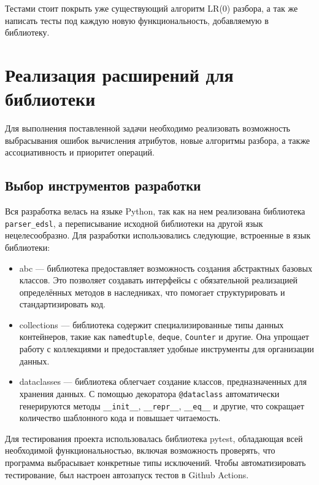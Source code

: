 \documentclass[14pt, russian]{scrartcl}
\begin{document}
Тестами стоит покрыть уже существующий алгоритм LR(0) разбора, а так же написать тесты под каждую новую функциональность,
добавляемую в библиотеку.

\section{Реализация расширений для библиотеки}

Для выполнения поставленной задачи необходимо реализовать возможность выбрасывания ошибок вычисления атрибутов,
новые алгоритмы разбора, а также ассоциативность и приоритет операций.

\subsection{Выбор инструментов разработки}

Вся разработка велась на языке Python, так как на нем реализована библиотека \texttt{parser\_edsl}, а переписывание
исходной библиотеки на другой язык нецелесообразно. Для разработки использовались следующие, встроенные в
язык библиотеки:

\begin{itemize}
	\item abc\cite{abc} --- библиотека предоставляет возможность создания абстрактных базовых классов. Это позволяет
	создавать интерфейсы с обязательной реализацией определённых методов в
	наследниках, что помогает структурировать и стандартизировать код.
	\item collections\cite{collections} --- библиотека содержит специализированные типы данных контейнеров, такие как
	\texttt{namedtuple}, \texttt{deque}, \texttt{Counter} и другие. Она упрощает работу с коллекциями и
	предоставляет удобные инструменты для организации данных.
	\item dataclasses\cite{dataclasses} --- библиотека облегчает создание классов, предназначенных для хранения данных. С помощью
	декоратора \texttt{@dataclass} автоматически генерируются методы \texttt{\_\_init\_\_}, \texttt{\_\_repr\_\_},
	\texttt{\_\_eq\_\_} и другие, что сокращает количество шаблонного кода и повышает читаемость.
\end{itemize}

Для тестирования проекта использовалась библиотека pytest, обладающая всей необходимой функциональностью, включая
возможность проверять, что программа выбрасывает конкретные типы исключений. Чтобы автоматизировать тестирование,
был настроен автозапуск тестов в Github Actions\cite{CI}.
\end{document}
